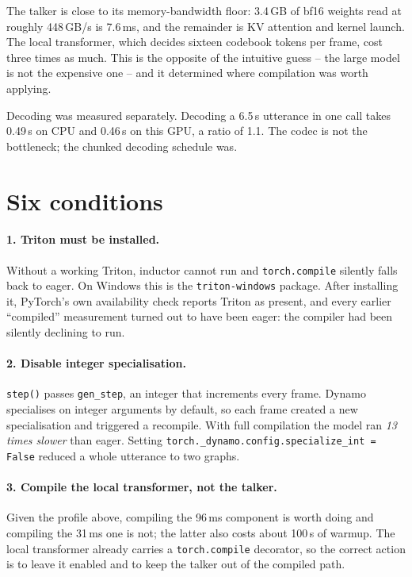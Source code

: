 \documentclass[11pt]{article}
\begin{document}
The talker is close to its memory-bandwidth floor: 3.4\,GB of bf16 weights read at roughly 448\,GB/s is 7.6\,ms,
and the remainder is KV attention and kernel launch. The local transformer, which decides sixteen codebook tokens
per frame, cost three times as much. This is the opposite of the intuitive guess -- the large model is not the
expensive one -- and it determined where compilation was worth applying.

Decoding was measured separately. Decoding a 6.5\,s utterance in one call takes 0.49\,s on CPU and 0.46\,s on this
GPU, a ratio of 1.1. The codec is not the bottleneck; the chunked decoding schedule was.

\section{Six conditions}

\paragraph{1. Triton must be installed.} Without a working Triton, inductor cannot run and \texttt{torch.compile}
silently falls back to eager. On Windows this is the \texttt{triton-windows} package. After installing it, PyTorch's own availability check
reports Triton as present, and every earlier ``compiled'' measurement turned out to have been eager: the compiler
had been silently declining to run.

\paragraph{2. Disable integer specialisation.} \texttt{step()} passes \texttt{gen\_step}, an integer that
increments every frame. Dynamo specialises on integer arguments by default, so each frame created a new
specialisation and triggered a recompile. With full compilation the model ran \emph{13 times slower} than eager.
Setting \texttt{torch.\_dynamo.config.specialize\_int = False} reduced a whole utterance to two graphs.

\paragraph{3. Compile the local transformer, not the talker.} Given the profile above, compiling the 96\,ms
component is worth doing and compiling the 31\,ms one is not; the latter also costs about 100\,s of warmup. The
local transformer already carries a \texttt{torch.compile} decorator, so the correct action is to leave it enabled
and to keep the talker out of the compiled path.
\end{document}
